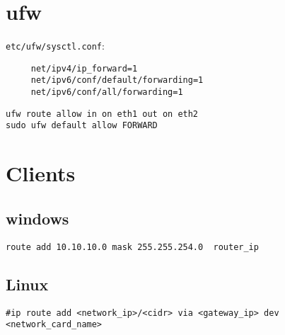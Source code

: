 \section{ufw}

\verb+etc/ufw/sysctl.conf+:
\begin{verbatim}
     net/ipv4/ip_forward=1
     net/ipv6/conf/default/forwarding=1
     net/ipv6/conf/all/forwarding=1
\end{verbatim}

\begin{verbatim}
ufw route allow in on eth1 out on eth2
sudo ufw default allow FORWARD
\end{verbatim}


\section{Clients}
\subsection{windows}
\begin{verbatim}
route add 10.10.10.0 mask 255.255.254.0  router_ip
\end{verbatim}


\subsection{Linux}
\begin{verbatim}
#ip route add <network_ip>/<cidr> via <gateway_ip> dev <network_card_name>
\end{verbatim}
